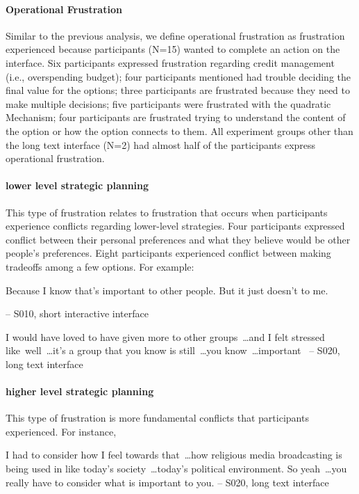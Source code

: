 \paragraph{Operational Frustration} Similar to the previous analysis, we define operational frustration as frustration experienced because participants (N=15) wanted to complete an action on the interface. Six participants expressed frustration regarding credit management (i.e., overspending budget); four participants mentioned had trouble deciding the final value for the options; three participants are frustrated because they need to make multiple decisions; five participants were frustrated with the quadratic Mechanism; four participants are frustrated trying to understand the content of the option or how the option connects to them. All experiment groups other than the long text interface (N=2) had almost half of the participants express operational frustration.

\paragraph{lower level strategic planning} This type of frustration relates to frustration that occurs when participants experience conflicts regarding lower-level strategies. Four participants expressed conflict between their personal preferences and what they believe would be other people's preferences. Eight participants experienced conflict between making tradeoffs among a few options. For example:

\begin{displayquote}
Because I know that's important to other people. But it just doesn't to me.
    
\noindent \hfill -- S010, short interactive interface
\end{displayquote}

\begin{displayquote}
I would have loved to have given more to other groups~\ldots and I felt stressed like~\bracketellipsis well~\ldots it's a group that you know is still~\ldots you know~\ldots important~\bracketellipsis
\noindent \hfill -- S020, long text interface
\end{displayquote}

\paragraph{higher level strategic planning} This type of frustration is more fundamental conflicts that participants experienced. For instance, 
\begin{displayquote}
I had to consider how I feel towards that~\ldots how religious media broadcasting is being used in like today's society~\ldots today's political environment. So yeah~\ldots you really have to consider what is important to you. 
\noindent \hfill -- S020, long text interface
\end{displayquote}

